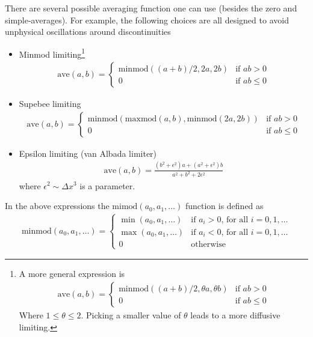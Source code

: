\documentclass[12pt]{article}
\theoremstyle{definition}
\theoremstyle{definition}
\theoremstyle{definition}
\begin{document}
There are several possible averaging function one can use (besides the
zero and simple-averages). For example, the following choices are all
designed to avoid unphysical oscillations around discontinuities
\begin{itemize}
  \item Minmod limiting\footnote{A more general expression is
      \begin{align}
        \mathrm{ave}(a,b) = 
        \begin{cases}
          \mathrm{minmod}((a+b)/2, \theta a, \theta b)& \text{if $ab>0$} \\
          0& \text{if $ab\le 0$}
        \end{cases}
      \end{align}
      Where $1\le \theta \le 2$. Picking a smaller value of $\theta$
      leads to a more diffusive limiting.
    }
    \begin{align}
      \mathrm{ave}(a,b) = 
      \begin{cases}
        \mathrm{minmod}((a+b)/2, 2a, 2b)& \text{if $ab>0$} \\
        0& \text{if $ab\le 0$}
      \end{cases}
    \end{align}

  \item Supebee limiting
    \begin{align}
      \mathrm{ave}(a,b) = 
      \begin{cases}
        \mathrm{minmod}\left(
          \mathrm{maxmod}(a,b), \mathrm{minmod}(2a,2b)
          \right)& \text{if $ab>0$} \\
        0& \text{if $ab\le 0$}
      \end{cases}
    \end{align}

  \item Epsilon limiting (van Albada limiter)
    \begin{align}
      \mathrm{ave}(a,b) = \frac{(b^2+\epsilon^2)a + (a^2+\epsilon^2)b}{a^2+b^2+2\epsilon^2}
    \end{align}
    where $\epsilon^2 \sim \Delta x^3$ is a parameter.
\end{itemize}
In the above expressions the $\mathrm{mimod}(a_0,a_1,\ldots)$ function
is defined as
\begin{align}
  \mathrm{minmod}(a_0,a_1,\ldots) =
  \begin{cases}
    \min(a_0,a_1,\ldots)& \text{if $a_i>0$, for all $i=0,1,\ldots$} \\
    \max(a_0,a_1,\ldots)& \text{if $a_i<0$, for all $i=0,1,\ldots$} \\
    0& \text{otherwise}
  \end{cases}
\end{align}
\end{document}
